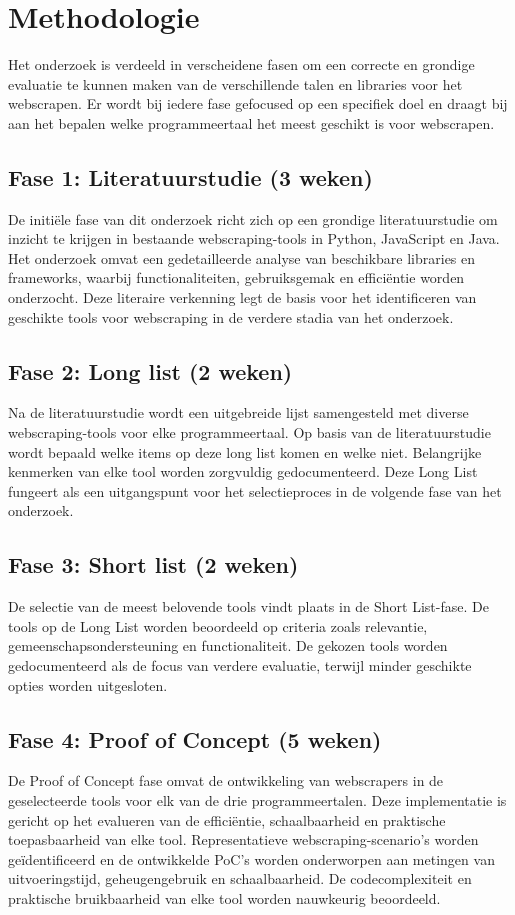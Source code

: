 \section{Methodologie}%
\label{sec:methodologie}
Het onderzoek is verdeeld in verscheidene fasen om een correcte en grondige evaluatie te kunnen maken van de verschillende talen
en libraries voor het webscrapen. Er wordt bij iedere fase gefocused op een specifiek doel en draagt bij aan het bepalen welke
programmeertaal het meest geschikt is voor webscrapen.

\subsection{Fase 1: Literatuurstudie (3 weken)}
De initiële fase van dit onderzoek richt zich op een grondige literatuurstudie om inzicht te krijgen in bestaande webscraping-tools in Python,
JavaScript en Java. Het onderzoek omvat een gedetailleerde analyse van beschikbare libraries en frameworks, 
waarbij functionaliteiten, gebruiksgemak en efficiëntie worden onderzocht. Deze literaire verkenning legt de 
basis voor het identificeren van geschikte tools voor webscraping in de verdere stadia van het onderzoek.

\subsection{Fase 2: Long list (2 weken)}
Na de literatuurstudie wordt een uitgebreide lijst samengesteld met diverse webscraping-tools voor elke programmeertaal. 
Op basis van de literatuurstudie wordt bepaald welke items op deze long list komen en welke niet. Belangrijke kenmerken van elke tool 
worden zorgvuldig gedocumenteerd. Deze Long List fungeert als een uitgangspunt voor het selectieproces in de volgende fase 
van het onderzoek.

\subsection{Fase 3: Short list (2 weken)}
De selectie van de meest belovende tools vindt plaats in de Short List-fase. De tools op de Long List worden beoordeeld op 
criteria zoals relevantie, gemeenschapsondersteuning en functionaliteit. 
De gekozen tools worden gedocumenteerd als de focus van verdere evaluatie, terwijl minder geschikte opties 
worden uitgesloten.

\subsection{Fase 4: Proof of Concept (5 weken)}
De Proof of Concept fase omvat de ontwikkeling van webscrapers in de geselecteerde tools voor elk van de drie programmeertalen. 
Deze implementatie is gericht op het evalueren van de efficiëntie, schaalbaarheid en praktische toepasbaarheid van elke tool. 
Representatieve webscraping-scenario's worden geïdentificeerd en de ontwikkelde PoC's worden onderworpen aan metingen van 
uitvoeringstijd, geheugengebruik en schaalbaarheid. De codecomplexiteit en praktische bruikbaarheid van elke tool worden 
nauwkeurig beoordeeld.

